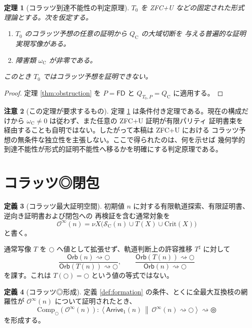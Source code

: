 \documentclass[a4paper,11pt]{ltjsarticle}
\theoremstyle{definition}
\newtheorem{definition}{定義}[section]
\newtheorem{remark}[definition]{注意}
\theoremstyle{plain}
\newtheorem{theorem}[definition]{定理}
\newcommand{\dfix}{\mathord{\text{○}}}
\newcommand{\udfix}{\mathord{\text{◎}}}
\newcommand{\Comp}{\mathrm{Comp}_{\dfix}}
\newcommand{\Arr}{\mathsf{Arrive}_{1}}
\newcommand{\FD}{\mathsf{FD}}
\newcommand{\Crit}{\mathrm{Crit}}
\newcommand{\1}{\mathbf{1}}
\begin{document}
\begin{theorem}[コラッツ到達不能性の判定原理]\label{thm:collatz-obstruction}
$T_0$ を ZFC+U などの固定された形式理論とする。次を仮定する。
\begin{enumerate}
 \item $T_0$ のコラッツ予想の任意の証明から $Q_{\mathrm C}$ の大域切断を
       与える普遍的な証明実現写像がある。
 \item 障害類 $\omega_{\mathrm C}$ が非零である。
\end{enumerate}
このとき $T_0$ ではコラッツ予想を証明できない。
\end{theorem}

\begin{proof}
定理 \ref{thm:obstruction} を $P=\FD$ と
$Q_{T_0,P}=Q_{\mathrm C}$ に適用する。
\end{proof}

\begin{remark}[この定理が要求するもの]
定理 \ref{thm:collatz-obstruction} は条件付き定理である。現在の構成だけから
$\omega_{\mathrm C}\ne0$ は従わず、また任意の ZFC+U 証明が有限パリティ
証明書束を経由することも自明ではない。したがって本稿は ZFC+U における
コラッツ予想の無条件な独立性を主張しない。ここで得られたのは、何を示せば
幾何学的到達不能性が形式的証明不能性へ移るかを明確にする判定原理である。
\end{remark}

\section{コラッツ◎閉包}

\begin{definition}[コラッツ最大証明空間]
初期値 $n$ に対する有限軌道探索、有限証明書、逆向き証明書および閉包への
再検証を含む通常対象を
\[
 \mathcal O^\infty(n)
 =\nu X\bigl(\mathcal S_{\mathrm C}(n)\cup T(X)\cup\Crit(X)\bigr)
\]
と書く。
\end{definition}

通常写像 $T$ を $\dfix$ へ値として拡張せず、軌道判断上の許容推移
$T^\sharp$ に対して
\begin{equation}\label{eq:collatz-origin}
 \frac{\mathsf{Orb}(n)\rightsquigarrow\dfix}
      {\mathsf{Orb}(T(n))\rightsquigarrow\dfix},
 \qquad
 \frac{\mathsf{Orb}(T(n))\rightsquigarrow\dfix}
      {\mathsf{Orb}(n)\rightsquigarrow\dfix}
\end{equation}
を課す。これは $T(\dfix)=\dfix$ という値の等式ではない。

\begin{definition}[コラッツ◎形成]
定義 \ref{def:formation} の条件、とくに全最大互換枝の網羅性が
$\mathcal O^\infty(n)$ について証明されたとき、
\begin{equation}\label{eq:collatz-closure}
 \Comp(\mathcal O^\infty(n)):
 \left\langle
   \Arr(n)
   \ \middle\Vert\
   \mathcal O^\infty(n)\rightsquigarrow\dfix
 \right\rangle
 \rightsquigarrow\udfix
\end{equation}
を形成する。
\end{definition}
\end{document}
